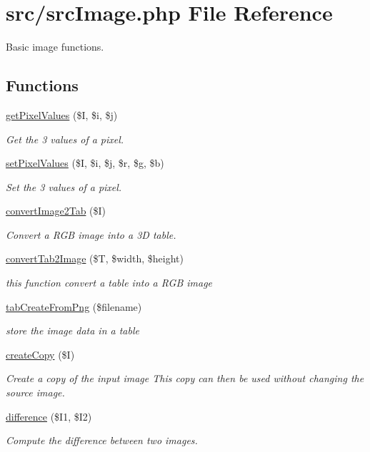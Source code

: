 \hypertarget{src_image_8php}{
\section{src/src\-Image.php \-File \-Reference}
\label{src_image_8php}
}


\-Basic image functions.  


\subsection*{\-Functions}
\begin{DoxyCompactItemize}
\item 
\hyperlink{src_image_8php_ab73076b368326e499ce3107206882e4d}{get\-Pixel\-Values} (\$\-I, \$i, \$j)
\begin{DoxyCompactList}\small\item\em \-Get the 3 values of a pixel. \end{DoxyCompactList}\item 
\hyperlink{src_image_8php_a0570e456a725214ce051800c3eb2cc83}{set\-Pixel\-Values} (\$\-I, \$i, \$j, \$r, \$g, \$b)
\begin{DoxyCompactList}\small\item\em \-Set the 3 values of a pixel. \end{DoxyCompactList}\item 
\hyperlink{src_image_8php_a071952c3f25b07f2880b97a13499ff3f}{convert\-Image2\-Tab} (\$\-I)
\begin{DoxyCompactList}\small\item\em \-Convert a \-R\-G\-B image into a 3\-D table. \end{DoxyCompactList}\item 
\hyperlink{src_image_8php_ab8172dbbfa8148d42dc1a0a2121f648e}{convert\-Tab2\-Image} (\$\-T, \$width, \$height)
\begin{DoxyCompactList}\small\item\em this function convert a table into a \-R\-G\-B image \end{DoxyCompactList}\item 
\hyperlink{src_image_8php_ab284b36339e9c39321efdd780d1052b4}{tab\-Create\-From\-Png} (\$filename)
\begin{DoxyCompactList}\small\item\em store the image data in a table \end{DoxyCompactList}\item 
\hyperlink{src_image_8php_a904b319b055d0880a306e466e164ec48}{create\-Copy} (\$\-I)
\begin{DoxyCompactList}\small\item\em \-Create a copy of the input image \-This copy can then be used without changing the source image. \end{DoxyCompactList}\item 
\hyperlink{src_image_8php_a1bbbb1b3ff70927526f343cf280f50c3}{difference} (\$\-I1, \$\-I2)
\begin{DoxyCompactList}\small\item\em \-Compute the difference between two images. \end{DoxyCompactList}\end{DoxyCompactItemize}


